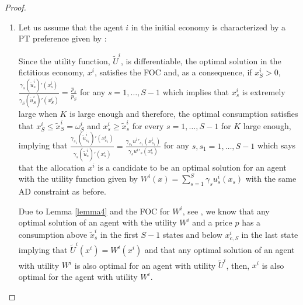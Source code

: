 \documentclass[pdftex]{article}
\numberwithin{equation}{section}
\theoremstyle{th}
\newtheorem{proof lemma}{{Proof Lemma}.}
\theoremstyle{definition}
\begin{document}
{\begin{proof}
\begin{enumerate}
To finish this part, we must prove that for an agent given by
$U^{i}$, the allocation $x^{i}$ is also optimal given the price
$p$ for $K$ large enough. Since $\nicefrac{p_{s}}{p_{s+1}}\sim0$ for every $s=1,\dots,S-1$ when $K$ is large enough,
the optimal solution of an agent with the utility function given by $\sum_{s}\beta_{s}u^{i}_s(x_{s})$
and equilibrium price $p$ will have the following order of consumption
$x_{1}>x_{2}>\dots>x_{S-1}>\max_s\tilde{x}^{i}_s=\max_s\omega^{i}_s>x_{c,S}^{i}=x_{S}=0$
where $\left\{u^{i}_s\right\}_{s=1,\dots,S}$ is the value function of the agent $i$ in each state $s$ and $\left(\beta_{s}\right)_{s}\geq\min_{\alpha\in[0,1]:\underline{\pi}+\alpha\leq1}w^{i}\left(\underline{\pi}+\alpha\right)-w^{i}\left(\alpha\right)>0$
and $\sum_{s}\beta_{s}\leq S\left(1-\min_{\alpha\in[0,1]:\underline{\pi}+\alpha\leq1}w^{i}\left(\underline{\pi}+\alpha\right)-w^{i}\left(\alpha\right)\right)$.
Therefore, a Prospect Theory agent will have the same order of consumption
as the one described before, implying that the allocation $x^{i}$
is optimal for the agent $i$ in the initial economy for large enough $K$.
\item Let us assume that the agent $i$ in the initial economy is characterized
by a PT preference given by \cite{JS}:

Since the utility function, $\tilde{U}^i$, is differentiable, the
optimal solution in the fictitious economy, $x^{i}$,
satisfies the FOC and, as a consequence, if $x_{S}^{i}>0$, $\frac{\gamma_{s}{\left(\tilde{u}_{s}^{i}\right)}'\left(x_{s}^{i}\right)}{\gamma_{S}{\left(\tilde{u}_{S}^{i}\right)}'\left(x_{S}^{i}\right)}=\frac{p_{s}}{p_{S}}$
for any $s=1,\dots,S-1$ which implies that $x_{s}^{i}$ is extremely large when $K$ is large enough and therefore, the optimal consumption
satisfies that $x_{S}^{i}\leq\tilde{x}^{i}_S=\omega^{i}_S$ and $x_{s}^{i}\geq\tilde{x}^{i}_s$
for every $s=1,\dots,S-1$ for $K$ large enough, implying that
$\frac{\gamma_{s_{1}}{\left(\tilde{u}_{s_{1}}^{i}\right)}'\left(x_{s_{1}}^{i}\right)}{\gamma_{s}{\left(\tilde{u}_{s}^{i}\right)}'\left(x_{s}^{i}\right)}=\frac{\gamma_{s_{1}}{u^{i}}'_{s_1}\left(x_{s_{1}}^{i}\right)}{\gamma_{s}{u^{i}}'_s\left(x_{s}^{i}\right)}$
for any $s,s_{1}=1,\dots,S-1$ which says that the allocation $x^{i}$
is a candidate to be an optimal solution for an agent with the utility
function given by $W^{i}(x)=\sum_{s=1}^{S}\gamma_{s}u^{i}_s(x_{s})$
with the same AD constraint as before.

Due to Lemma \ref{lemma4}
and the FOC for $W^{i}$, see \cite{IS}, we know that any optimal
solution of an agent with the utility $W^{i}$ and a price $p$
has a consumption above $\tilde{x}^{i}_s$ in the first $S-1$ states
and below $x_{c,S}^{i}$ in the last state implying that $\tilde{U}^{i}\left(x^{i}\right)=W^{i}\left(x^{i}\right)$ and that any optimal
solution of an agent with utility $W^{i}$ is also optimal for an agent with utility $\tilde{U}^{i}$, then, $x^{i}$ is also optimal for the agent with utility
$W^{i}$.


\end{enumerate}
\end{proof}}
\end{document}
